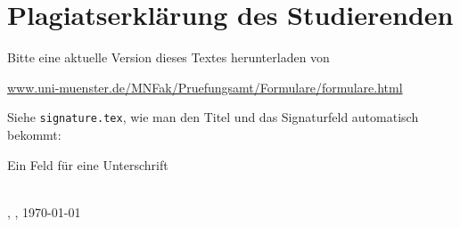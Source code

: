 \chapter*{Plagiatserklärung des Studierenden}
Bitte eine aktuelle Version dieses Textes herunterladen von

\url{www.uni-muenster.de/MNFak/Pruefungsamt/Formulare/formulare.html}


Siehe \texttt{signature.tex}, wie man den Titel und das Signaturfeld automatisch bekommt: 

\begin{center}
\textit{\printtitle}
\end{center}


Ein Feld für eine Unterschrift

\vspace{0.75cm}
\parbox{17em}{\hrulefill} \\
\printname, \printcity, \today


